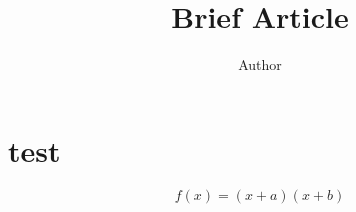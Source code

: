 \documentclass[11pt]{article} %
\title{Brief Article}
\author{Author}
\begin{document}
\maketitle
\tableofcontents

\section{test}

\begin{equation}
     f(x)=(x+a)(x+b)
 \end{equation}

\end{document}
